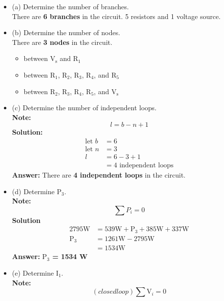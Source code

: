 \documentclass{article}
\begin{document}
\begin{itemize}
	\item (a) Determine the number of branches. \\
		There are \textbf{6 branches} in the circuit. 5 resistors and 1 voltage source.
	\item (b) Determine the number of nodes. \\
		There are \textbf{3 nodes} in the circuit.
		\begin{itemize}
			\item between $\text{V}_\text{s}$ and $\text{R}_\text{1}$
			\item between $\text{R}_\text{1}$, $\text{R}_\text{2}$, $\text{R}_\text{3}$, $\text{R}_\text{4}$, and $\text{R}_\text{5}$
			\item between $\text{R}_\text{2}$, $\text{R}_\text{3}$, $\text{R}_\text{4}$, $\text{R}_\text{5}$, and $\text{V}_\text{s}$
		\end{itemize}
	\item (c) Determine the number of independent loops. \\
		\textbf{Note:}
		\begin{equation}
			l = b - n + 1
		\end{equation}
		\textbf{Solution:}
		\begin{align*}
			\text{let } b &= 6 \\
			\text{let } n &= 3 \\
			l &= 6 - 3 + 1 \\
			&= 4 \text{ independent loops}
		\end{align*}
		\textbf{Answer:} There are \textbf{4 independent loops} in the circuit.
	\item (d) Determine $\text{P}_3$. \\
		\textbf{Note:}
		\begin{equation}
			\sum{P_i} = 0
		\end{equation}
		\textbf{Solution}
		\begin{align*}
			2795 \text{W} &= 539 \text{W} + \text{P}_3 + 385 \text{W} + 337 \text{W} \\
			\text{P}_3 &= 1261 \text{W} - 2795 \text{W} \\
			&= 1534 \text{W}
		\end{align*}
		\textbf{Answer:} \textbf{$\text{P}_3$ = 1534 W}
	\item (e) Determine $\text{I}_1$. \\
		\textbf{Note:}
		\begin{equation}
			(closed loop) \sum{\text{V}_i} = 0

\end{equation}
\end{itemize}
\end{document}
